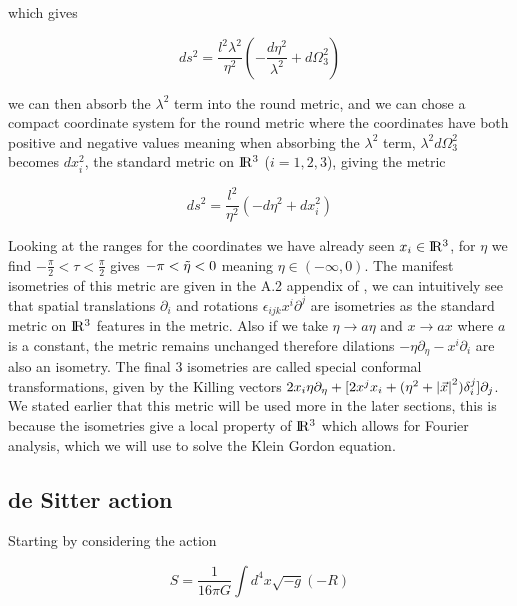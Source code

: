 \documentclass[a4paper,11pt]{article}
\numberwithin{equation}{section}
\numberwithin{figure}{section}
\begin{document}
\begin{large}
\newpage

which gives

\begin{equation}
\label{planar metric1}    
    ds^2=\frac{l^2 \lambda^2}{\eta^2}\left(-\frac{d\eta^2}{\lambda^2}+d\Omega^2_3 \right)
\end{equation}


we can then absorb the $\lambda^2$ term into the round metric, and we can chose a compact coordinate system for the round metric where the coordinates have both positive and negative values meaning when absorbing the $\lambda^2$ term, $\lambda^2d\Omega^2_3$ becomes $dx^2_i$, the standard metric on $\rm I\!R^3$ ($i=1,2,3$), giving the metric

\begin{equation}
\label{planar metric}
    ds^2=\frac{l^2}{\eta^2}(-d\eta^2+dx_i^2)
\end{equation}

Looking at the ranges for the coordinates we have already seen $x_i \in \rm I\!R^3$, for $\eta$ we find $-\frac{\pi}{2}<\tau<\frac{\pi}{2}$ gives $-\pi<\Tilde{\eta}<0$ meaning $\eta \in (-\infty,0)$. The manifest isometries of this metric are given in the A.2 appendix of \cite{Killing appendix}, we can intuitively see that spatial translations $\partial_i$ and rotations $\epsilon_{ijk}x^i\partial^j$ are isometries as the standard metric on $\rm I\!R^3$ features in the metric. Also if we take $\eta \rightarrow a\eta$ and $x \rightarrow ax$ where $a$ is a constant, the metric remains unchanged therefore dilations $-\eta\partial_{\eta}-x^i\partial_i$ are also an isometry. The final 3 isometries are called special conformal transformations, given by the Killing vectors $2x_i\eta\partial_{\eta}+[2x^jx_i+(\eta^2+\abs{\Vec{x}}^2)\delta^j_i]\partial_j$. We stated earlier that this metric will be used more in the later sections, this is because the isometries give a local property of $\rm I\!R^3$ which allows for Fourier analysis, which we will use to solve the Klein Gordon equation. 


\subsection{de Sitter action}

Starting by considering the action

\begin{equation}
\label{de Sitter action}
    S=\frac{1}{16\pi G} \int d^4x \sqrt{-g} (-R)
\end{equation}


\end{large}
\end{document}
